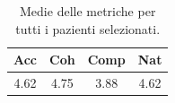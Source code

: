 
\begin{table}[!h]
\centering
\begin{tabular}{||c c c c||}
\hline
Acc & Coh & Comp & Nat \\ [0.5ex]
\hline\hline
4.62 & 4.75 & 3.88 & 4.62 \\
\hline
\end{tabular}
\caption{Medie delle metriche per tutti i pazienti selezionati.}
\label{tab:metriche_finali_pazienti}
\end{table}
